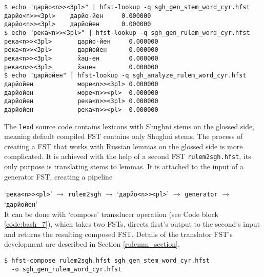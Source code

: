 \begin{code_frame}[float]
    \begin{footnotesize}
    \begin{verbatim}
$ echo "дарйо<n>><3pl>" | hfst-lookup -q sgh_gen_stem_word_cyr.hfst
дарйо<n>><3pl>	  дарйо-йен     0.000000
дарйо<n>><3pl>	  дарйойен      0.000000
$ echo "река<n>><3pl>" | hfst-lookup -q sgh_gen_rulem_word_cyr.hfst
река<n>><3pl>	    дарйо-йен     0.000000
река<n>><3pl>	    дарйойен      0.000000
река<n>><3pl>	    х̌ац-ен        0.000000
река<n>><3pl>	    х̌ацен         0.000000
$ echo "дарйойен" | hfst-lookup -q sgh_analyze_rulem_word_cyr.hfst
дарйойен	        море<n>><3pl> 0.000000
дарйойен	        море<n>><pl>  0.000000
дарйойен	        река<n>><3pl> 0.000000
дарйойен	        река<n>><pl>  0.000000
    \end{verbatim}
    \end{footnotesize}
    \tcblower
    \label{code:pipeline_3}
\end{code_frame}

The \texttt{lexd} source code contains lexicons with Shughni stems on the glossed side, meaning default compiled FST contains only Shughni stems. The process of creating a FST that works with Russian lemmas on the glossed side is more complicated. It is achieved with the help of a second FST \texttt{rulem2sgh.hfst}, its only purpose is translating stems to lemmas. It is attached to the input of a generator FST, creating a pipeline 

\vspace*{0.3cm}
\noindent `\texttt{река<n>><pl>}' $\rightarrow$ \texttt{rulem2sgh} $\rightarrow$ `\texttt{дарйо<n>><pl>}' $\rightarrow$ \texttt{generator} $\rightarrow$ `\texttt{дарйойен}'\\


It can be done with `compose' transducer operation (see Code block \ref{code:bash_7}), which takes two FSTs, directs first's output to the second's input and returns the resulting composed FST. Details of the translator FST's development are described in Section \ref{rulemm_section}.

\begin{code_frame}[float]
    \begin{footnotesize}
    \begin{verbatim}
$ hfst-compose rulem2sgh.hfst sgh_gen_stem_word_cyr.hfst
  -o sgh_gen_rulem_word_cyr.hfst
    \end{verbatim}
    \end{footnotesize}
    \tcblower
    \label{code:bash_7}
\end{code_frame}


